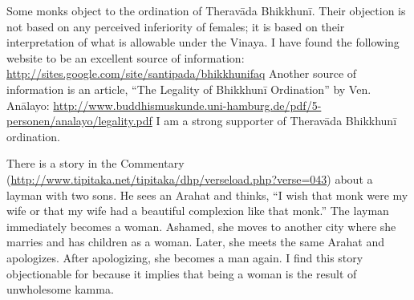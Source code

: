 Some monks object to the ordination of Theravāda Bhikkhunī. Their objection is not based on any perceived inferiority of females; it is based on their interpretation of what is allowable under the Vinaya. I have found the following website to be an excellent source of information: \url{http://sites.google.com/site/santipada/bhikkhunifaq} Another source of information is an article, “The Legality of Bhikkhunī Ordination” by Ven. Anālayo: \url{http://www.buddhismuskunde.uni-hamburg.de/pdf/5-personen/analayo/legality.pdf} I am a strong supporter of Theravāda Bhikkhunī ordination. 

There is a story in the Commentary (\url{http://www.tipitaka.net/tipitaka/dhp/verseload.php?verse=043}) about a layman with two sons. He sees an Arahat and thinks, “I wish that monk were my wife or that my wife had a beautiful complexion like that monk.” The layman immediately becomes a woman. Ashamed, she moves to another city where she marries and has children as a woman. Later, she meets the same Arahat and apologizes. After apologizing, she becomes a man again. I find this story objectionable for because it implies that being a woman is the result of unwholesome kamma.